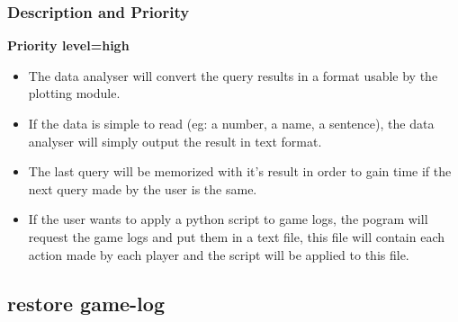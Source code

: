 \documentclass{scrreprt}
\begin{document}
\subsubsection{Description and Priority}
\textbf{Priority level=high}\\
\begin{itemize}
\item The data analyser will convert the query results in a format usable by the plotting module.
\item If the data is simple to read (eg: a number, a name, a sentence), the data analyser will simply output the result in text format.
\item The last query will be memorized with it's result in order to gain time if the next query made by the user is the same.
\item If the user wants to apply a python script to game logs, the pogram will request the game logs and put them in a text file, this file will contain each action made by each player and the script will be applied to this file.
\end{itemize}

\subsection{restore game-log}
\end{document}
